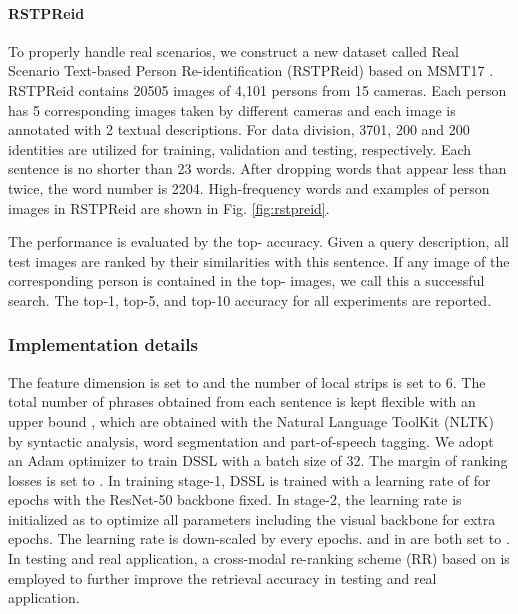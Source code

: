 \documentclass[sigconf]{acmart}
\begin{document}
\paragraph{RSTPReid} To properly handle real scenarios, we construct a new dataset called Real Scenario Text-based Person Re-identification (RSTPReid) based on MSMT17 \cite{MSMT17}. RSTPReid contains 20505 images of 4,101 persons from 15 cameras. Each person has 5 corresponding images taken by different cameras and each image is annotated with 2 textual descriptions. For data division, 3701, 200 and 200 identities are utilized for training, validation and testing, respectively. Each sentence is no shorter than 23 words. After dropping words that appear less than twice, the word number is 2204. High-frequency words and examples of person images in RSTPReid are shown in Fig. \ref{fig:rstpreid}.

The performance is evaluated by the top- accuracy. Given a query description, all test images are ranked by their similarities with this sentence. If any image of the corresponding person is contained in the top- images, we call this a successful search. The top-1, top-5, and top-10 accuracy for all experiments are reported.

\subsubsection{Implementation details}
The feature dimension  is set to  and the number of local strips  is set to 6. The total number of phrases  obtained from each sentence is kept flexible with an upper bound , which are obtained with the Natural Language ToolKit (NLTK) by syntactic analysis, word segmentation and part-of-speech tagging. We adopt an Adam optimizer to train DSSL with a batch size of 32. The margin  of ranking losses is set to . In training stage-1, DSSL is trained with a learning rate of  for  epochs with the ResNet-50 backbone fixed. In stage-2, the learning rate is initialized as  to optimize all parameters including the visual backbone for extra  epochs. The learning rate is down-scaled by  every  epochs.  and  in  are both set to . In testing and real application, a cross-modal re-ranking scheme (RR) based on \cite{wang2019matchingRR} is employed to further improve the retrieval accuracy in testing and real application.
\end{document}
